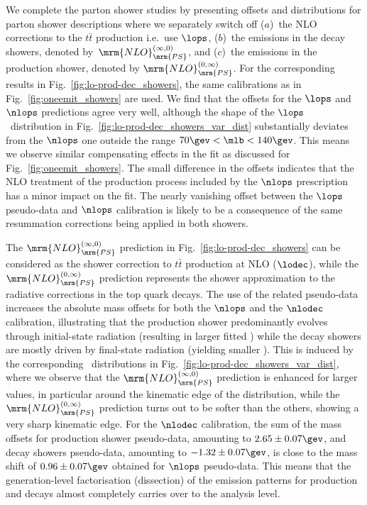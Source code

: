 We complete the parton shower studies by presenting offsets and
\mlb distributions for parton shower descriptions where we separately
switch off ($a$)~the NLO corrections to the $t\bar t$ production i.e.~use $\lops$,
($b$)~the emissions in the decay showers, denoted by~$\mrm{NLO}_\mrm{PS}^{(\infty,0)}$,
and ($c$)~the emissions in the production shower, denoted by $\mrm{NLO}_\mrm{PS}^{(0,\infty)}$.
%
For the corresponding results in Fig.~\ref{fig:lo-prod-dec_showers},
the same calibrations as in Fig.~\ref{fig:oneemit_showers} are used.
%
We find that the offsets for the $\lops$ and $\nlops$ predictions
agree very well, although the shape of the $\lops$ \mlb\ distribution
in Fig.~\ref{fig:lo-prod-dec_showers_var_dist} substantially deviates
from the $\nlops$ one outside the range $70\gev<\mlb<140\gev$.
%
This means we observe similar compensating effects in the fit as
discussed for Fig.~\ref{fig:oneemit_showers}.
%
The small difference in the offsets indicates that the NLO treatment
of the production process included by the $\nlops$ prescription has a
minor impact on the fit. The nearly vanishing offset between
the $\lops$ pseudo-data and $\nlops$ calibration is likely to be a consequence of
the same resummation corrections being applied in both showers.

%
The $\mrm{NLO}_\mrm{PS}^{(\infty,0)}$ prediction in Fig.~\ref{fig:lo-prod-dec_showers}
can be considered as the shower correction to $t\bar t$ production at NLO ($\lodec$), 
while the $\mrm{NLO}_\mrm{PS}^{(0,\infty)}$ prediction represents the shower approximation to the
radiative corrections in the top quark decays.
%
The use of the related pseudo-data increases the absolute mass offsets
for both the $\nlops$ and the $\nlodec$ calibration, illustrating that
the production shower predominantly evolves through initial-state
radiation (resulting in larger fitted \mt) while the decay showers are
mostly driven by final-state radiation (yielding smaller \mt).
%
This is induced by the corresponding \mlb\ distributions in
Fig.~\ref{fig:lo-prod-dec_showers_var_dist}, where we observe that the
$\mrm{NLO}_\mrm{PS}^{(\infty,0)}$ prediction is enhanced for larger \mlb
values, in particular around the kinematic edge of the distribution,
while the $\mrm{NLO}_\mrm{PS}^{(0,\infty)}$ prediction turns out to be
softer than the others, showing a very sharp kinematic edge.
%
For the $\nlodec$ calibration, the sum of the mass
offsets for production shower pseudo-data, amounting to
$2.65\pm0.07\gev$, and decay showers pseudo-data, amounting to
$-1.32\pm0.07\gev$, is close to the mass shift of $0.96\pm0.07\gev$
obtained for $\nlops$ pseudo-data.
%
This means that the generation-level factorisation (dissection) of the emission
patterns for production and decays almost completely carries over to
the analysis level.

